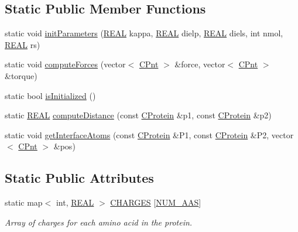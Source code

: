 \subsection*{Static Public Member Functions}
\begin{DoxyCompactItemize}
\item 
static void \hyperlink{classCProtein_aeff60f05cbd42168359f75187b9ac888}{init\-Parameters} (\hyperlink{util_8h_a5821460e95a0800cf9f24c38915cbbde}{R\-E\-A\-L} kappa, \hyperlink{util_8h_a5821460e95a0800cf9f24c38915cbbde}{R\-E\-A\-L} dielp, \hyperlink{util_8h_a5821460e95a0800cf9f24c38915cbbde}{R\-E\-A\-L} diels, int nmol, \hyperlink{util_8h_a5821460e95a0800cf9f24c38915cbbde}{R\-E\-A\-L} rs)
\item 
static void \hyperlink{classCProtein_a7d6c3fb53c773ea006d123e35301d9b8}{compute\-Forces} (vector$<$ \hyperlink{classCPnt}{C\-Pnt} $>$ \&force, vector$<$ \hyperlink{classCPnt}{C\-Pnt} $>$ \&torque)
\item 
static bool \hyperlink{classCProtein_a60767b1667e57c9a68045a6c148799cd}{is\-Initialized} ()
\item 
static \hyperlink{util_8h_a5821460e95a0800cf9f24c38915cbbde}{R\-E\-A\-L} \hyperlink{classCProtein_a3d071c05412cb0f2a423920d5ae000dc}{compute\-Distance} (const \hyperlink{classCProtein}{C\-Protein} \&p1, const \hyperlink{classCProtein}{C\-Protein} \&p2)
\item 
static void \hyperlink{classCProtein_a2e38b7c42c30f967591fafb5060bc4f7}{get\-Interface\-Atoms} (const \hyperlink{classCProtein}{C\-Protein} \&P1, const \hyperlink{classCProtein}{C\-Protein} \&P2, vector$<$ \hyperlink{classCPnt}{C\-Pnt} $>$ \&pos)
\end{DoxyCompactItemize}
\subsection*{Static Public Attributes}
\begin{DoxyCompactItemize}
\item 
static map$<$ int, \hyperlink{util_8h_a5821460e95a0800cf9f24c38915cbbde}{R\-E\-A\-L} $>$ \hyperlink{classCProtein_a5999d9758c6552f1c329cb3b5612485d}{C\-H\-A\-R\-G\-E\-S} \mbox{[}\hyperlink{pdb_8h_aaa82008f92b935630ccf49c27a4bcc6e}{N\-U\-M\-\_\-\-A\-A\-S}\mbox{]}
\begin{DoxyCompactList}\small\item\em Array of charges for each amino acid in the protein. \end{DoxyCompactList}\end{DoxyCompactItemize}



